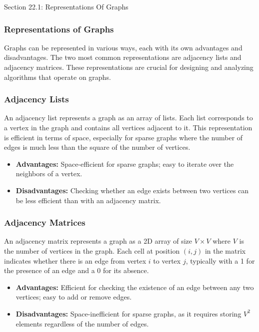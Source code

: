 \begin{notes}{Section 22.1: Representations Of Graphs}
    \subsubsection*{Representations of Graphs}

    Graphs can be represented in various ways, each with its own advantages and disadvantages. The two most common representations are adjacency lists and adjacency matrices. These representations 
    are crucial for designing and analyzing algorithms that operate on graphs. \vspace*{1em}
    
    \subsubsection*{Adjacency Lists}
    
    An adjacency list represents a graph as an array of lists. Each list corresponds to a vertex in the graph and contains all vertices adjacent to it. This representation is efficient in terms of 
    space, especially for sparse graphs where the number of edges is much less than the square of the number of vertices. 
    
    \begin{itemize}
        \item \textbf{Advantages:} Space-efficient for sparse graphs; easy to iterate over the neighbors of a vertex.
        \item \textbf{Disadvantages:} Checking whether an edge exists between two vertices can be less efficient than with an adjacency matrix.
    \end{itemize}
    
    \subsubsection*{Adjacency Matrices}
    
    An adjacency matrix represents a graph as a 2D array of size $V \times V$ where $V$ is the number of vertices in the graph. Each cell at position $(i, j)$ in the matrix indicates whether there is 
    an edge from vertex $i$ to vertex $j$, typically with a 1 for the presence of an edge and a 0 for its absence.
    
    \begin{itemize}
        \item \textbf{Advantages:} Efficient for checking the existence of an edge between any two vertices; easy to add or remove edges.
        \item \textbf{Disadvantages:} Space-inefficient for sparse graphs, as it requires storing $V^2$ elements regardless of the number of edges.
    \end{itemize}
    

\end{notes}
